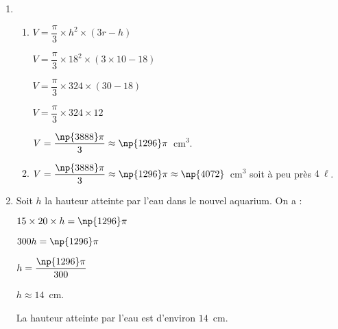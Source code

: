 \documentclass[10pt]{article}
\begin{document}
\begin{enumerate}
\item %


	\begin{enumerate}
		\item %
$V = \dfrac{\pi}{3} \times  h^2 \times (3r - h)$ 

$V = \dfrac{\pi}{3} \times 18^2 \times(3 \times 10 - 18)$

$V = \dfrac{\pi}{3} \times 324 \times (30 - 18)$

$V = \dfrac{\pi}{3} \times 324 \times 12$

$V = \dfrac{\np{3888}\pi}{3} \approx \np{1296} \pi$~cm$^3$.
		\item %
$V = \dfrac{\np{3888}\pi}{3} \approx \np{1296} \pi \approx \np{4072}$~cm$^3$ soit à peu près $4~\ell$.
	\end{enumerate}
\item %


Soit $h$ la hauteur atteinte par l’eau dans le nouvel aquarium. On a :

$15 \times 20 \times  h = \np{1296}\pi$

$300h = \np{1296}\pi$

$h = \dfrac{\np{1296}\pi}{300}$

$h \approx  14$~cm.

La hauteur atteinte par l’eau est d’environ $14$~cm.
\end{enumerate}
\end{document}
